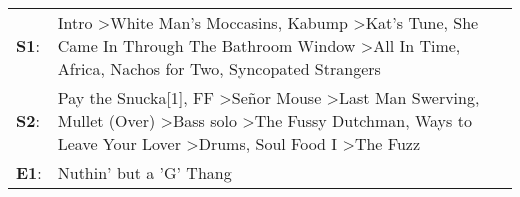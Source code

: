 \begin{supertabular}{p{0.03\textwidth}p{0.92\textwidth}}
 \textbf{S1}:  &                                                                                                      Intro\textsuperscript{} \textgreater \enspace White Man's Moccasins\textsuperscript{}, \enspace Kabump\textsuperscript{} \textgreater \enspace Kat's Tune\textsuperscript{}, \enspace She Came In Through The Bathroom Window\textsuperscript{} \textgreater \enspace All In Time\textsuperscript{}, \enspace Africa\textsuperscript{}, \enspace Nachos for Two\textsuperscript{}, \enspace Syncopated Strangers\textsuperscript{}  \enspace  \\
 \textbf{S2}:  &  Pay the Snucka[1]\textsuperscript{}, \enspace FF\textsuperscript{} \textgreater \enspace Señor Mouse\textsuperscript{} \textgreater \enspace Last Man Swerving\textsuperscript{}, \enspace Mullet (Over)\textsuperscript{} \textgreater \enspace Bass solo\textsuperscript{} \textgreater \enspace The Fussy Dutchman\textsuperscript{},  Ways to Leave Your Lover\textsuperscript{} \textgreater \enspace Drums\textsuperscript{}, \enspace Soul Food I\textsuperscript{} \textgreater \enspace The Fuzz\textsuperscript{}  \enspace  \\
 \textbf{E1}:  &                                                                                                                                                                                                                                                                                                                                                                                                                                                                                               Nuthin' but a 'G' Thang\textsuperscript{}  \enspace  \\
\end{supertabular}
